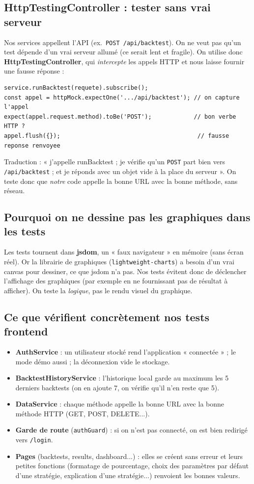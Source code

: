 \documentclass[11pt,a4paper]{article}
\newcommand{\code}[1]{\texttt{#1}}
\begin{document}
\subsection{HttpTestingController : tester sans vrai serveur}
Nos services appellent l'API (ex.\ \code{POST /api/backtest}). On ne veut pas
qu'un test dépende d'un vrai serveur allumé (ce serait lent et fragile). On
utilise donc \textbf{HttpTestingController}, qui \emph{intercepte} les appels HTTP
et nous laisse fournir une fausse réponse :
\begin{lstlisting}
service.runBacktest(requete).subscribe();
const appel = httpMock.expectOne('.../api/backtest'); // on capture l'appel
expect(appel.request.method).toBe('POST');            // bon verbe HTTP ?
appel.flush({});                                       // fausse reponse renvoyee
\end{lstlisting}
Traduction : « j'appelle runBacktest ; je vérifie qu'un \code{POST} part bien vers
\code{/api/backtest} ; et je réponds avec un objet vide à la place du serveur ».
On teste donc que \emph{notre} code appelle la bonne URL avec la bonne méthode,
sans réseau.

\subsection{Pourquoi on ne dessine pas les graphiques dans les tests}
Les tests tournent dans \textbf{jsdom}, un « faux navigateur » en mémoire (sans
écran réel). Or la librairie de graphiques (\code{lightweight-charts}) a besoin
d'un vrai canvas pour dessiner, ce que jsdom n'a pas. Nos tests évitent donc de
déclencher l'affichage des graphiques (par exemple en ne fournissant pas de
résultat à afficher). On teste la \emph{logique}, pas le rendu visuel du
graphique.

\subsection{Ce que vérifient concrètement nos tests frontend}
\begin{itemize}[leftmargin=1.4em,nosep]
  \item \textbf{AuthService} : un utilisateur stocké rend l'application
        « connectée » ; le mode démo aussi ; la déconnexion vide le stockage.
  \item \textbf{BacktestHistoryService} : l'historique local garde au maximum les
        5 derniers backtests (on en ajoute 7, on vérifie qu'il n'en reste que 5).
  \item \textbf{DataService} : chaque méthode appelle la bonne URL avec la bonne
        méthode HTTP (GET, POST, DELETE...).
  \item \textbf{Garde de route} (\code{authGuard}) : si on n'est pas connecté, on
        est bien redirigé vers \code{/login}.
  \item \textbf{Pages} (backtests, results, dashboard...) : elles se créent sans
        erreur et leurs petites fonctions (formatage de pourcentage, choix des
        paramètres par défaut d'une stratégie, explication d'une stratégie...)
        renvoient les bonnes valeurs.
\end{itemize}
\end{document}
